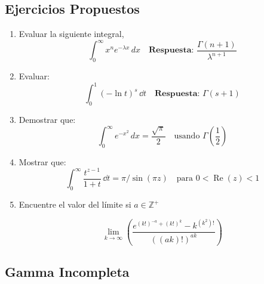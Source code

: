 \subsection{Ejercicios Propuestos}

\begin{enumerate}

	\item Evaluar la siguiente integral,
	      \[
		      \int_0^\infty x^n e^{-\lambda x} \, dx
		      \quad \textbf{Respuesta: } \frac{\Gamma(n+1)}{\lambda^{n+1}}
	      \]

	\item Evaluar:
	      \[
		      \int_0^1 (-\ln t)^s \, \dd{t}
		      \quad \textbf{Respuesta: } \Gamma(s+1)
	      \]

	\item Demostrar que:
	      \[
		      \int_0^\infty e^{-x^2} \, dx = \frac{\sqrt{\pi}}{2}
		      \quad \text{usando } \Gamma\left(\frac{1}{2}\right)
	      \]

	\item Mostrar que:
	      \[
		      \int_0^\infty \frac{t^{z-1}}{1 + t} \, \dd{t} = \pi / \sin(\pi z)
		      \quad \text{para } 0 < \operatorname{Re}(z) < 1
	      \]
	\item
	      Encuentre el valor del límite si $a \in \mathbb{Z^{+}}$

	      $$
		      \lim_{k \to \infty}    \left(\frac{e^{(k!)^{-a} +(k!)^k}-k^{(k^2)!}}{\left( (ak)!\right) ^{ak}} \right)
	      $$

\end{enumerate}

\subsection{Gamma Incompleta}





